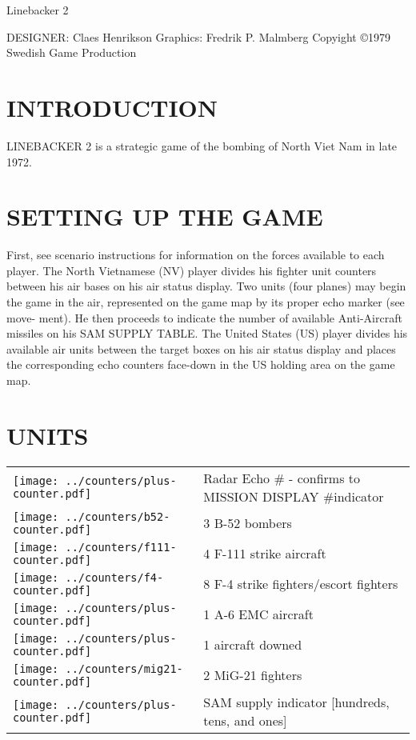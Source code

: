 Linebacker 2

DESIGNER: Claes Henrikson
Graphics: Fredrik P. Malmberg
Copyight ©1979
Swedish Game Production

\section*{INTRODUCTION}
LINEBACKER 2 is a strategic game
of the bombing of North Viet Nam in
late 1972.

\section*{SETTING UP THE GAME}
First, see scenario instructions for
information on the forces available
to each player. The North Vietnamese
(NV) player divides his fighter unit
counters between his air bases on his
air status display. Two units (four
planes) may begin the game in the
air, represented on the game map by
its proper echo marker (see move-
ment). He then proceeds to indicate
the number of available Anti-Aircraft
missiles on his SAM SUPPLY TABLE.
The United States (US) player
divides his available air units between
the target boxes on his air status
display and places the corresponding
echo counters face-down in the US
holding area on the game map.

\newcommand{\bfiftytwo}{\texttt{[image: ../counters/b52-counter.pdf]}}
\newcommand{\ffour}{\texttt{[image: ../counters/f4-counter.pdf]}}
\newcommand{\foneeleven}{\texttt{[image: ../counters/f111-counter.pdf]}}
\newcommand{\plus}{\texttt{[image: ../counters/plus-counter.pdf]}}
\newcommand{\migtwoone}{\texttt{[image: ../counters/mig21-counter.pdf]}}
\newcommand{\graphic}{\texttt{[image: ../counters/plus-counter.pdf]}}

\section*{UNITS}
\noindent
\begin{tabularx}{\linewidth}{@{} m{0.3in} X @{}}
   \graphic & Radar Echo \# - confirms to MISSION DISPLAY \#indicator \\
   \bfiftytwo & 3 B-52 bombers \\
   \foneeleven & 4 F-111 strike aircraft \\
   \ffour & 8 F-4 strike fighters/escort fighters \\
   \plus & 1 A-6 EMC aircraft \\
   \graphic & 1 aircraft downed \\
   \migtwoone & 2 MiG-21 fighters \\
   \graphic & SAM supply indicator [hundreds, tens, and ones] \\
 \end{tabularx}


